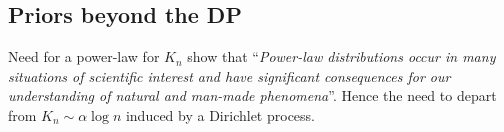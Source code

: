 

 \subsection[Other priors]{Priors beyond the DP}
 
 \begin{frame}{Need for a power-law for $K_n$}
 	\citet{newman2005power,clauset2009power} show that ``\textit{Power-law distributions occur in many situations of scientific interest and have
significant consequences for our understanding of natural and man-made phenomena}''.
		\pause
		Hence the need to depart from $K_n\sim \alpha \log n$ induced by a Dirichlet process.
 \end{frame}

